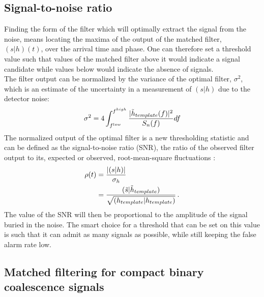 \documentclass[binding=0.6cm, LaM]{sapthesis}
\begin{document}
\subsection{Signal-to-noise ratio}

	Finding the form of the filter which will optimally extract the signal from the noise,
        means locating the maxima of the output of the matched filter, $(s|h)(t)$, 
	over the arrival time and phase.
        One can therefore set a threshold value such that values of the matched filter 
	above it would indicate a signal candidate while values below would indicate the absence of signals. \\
	The filter output can be normalized by the variance of the optimal filter, $\sigma^2$,
	which is an estimate of the uncertainty in a measurement of $(s|h)$ due to the detector noise:
                \begin{equation}
                        \sigma^2 =4 \int^{f^{high}}_{f^{low}} {{|\tilde h_{template}(f)|^2} \over {S_n(f)}}df
                \end{equation}
 	The normalized output of the optimal filter is a new thresholding statistic and can be defined as  
	the signal-to-noise ratio (SNR), the ratio of the observed filter output to its,
        expected or observed, root-mean-square fluctuations \cite{24}:
                \begin{align}
                        \rho(t) &= {{| (s|h) |} \over {\sigma_{h}}} \\
                             &= {{(\tilde s|\tilde h_{template})} \over {\sqrt{(h_{template}|h_{template})}}}\,.
                \end{align}
        The value of the SNR will then be proportional to the amplitude of the signal buried in the noise.
	The smart choice for a threshold that can be set on this value is such that
	it can admit as many signals as possible, while still keeping the false alarm rate low. 

\subsection{Matched filtering for compact binary coalescence signals}
\end{document}
